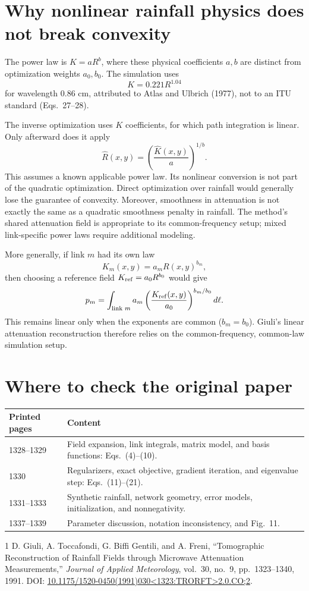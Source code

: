 \documentclass[11pt,a4paper]{article}
\begin{document}
\section{Why nonlinear rainfall physics does not break convexity}
The power law is $K=aR^b$, where these physical coefficients $a,b$ are distinct from optimization weights $a_0,b_0$. The simulation uses
\[
K=0.221R^{1.04}
\]
for wavelength $0.86$ cm, attributed to Atlas and Ulbrich (1977), not to an ITU standard (Eqs.~27--28).

The inverse optimization uses $K$ coefficients, for which path integration is linear. Only afterward does it apply
\[
\widehat R(x,y)=\left(\frac{\widehat K(x,y)}a\right)^{1/b}.
\]
This assumes a known applicable power law. Its nonlinear conversion is not part of the quadratic optimization. Direct optimization over rainfall would generally lose the guarantee of convexity. Moreover, smoothness in attenuation is not exactly the same as a quadratic smoothness penalty in rainfall. The method's shared attenuation field is appropriate to its common-frequency setup; mixed link-specific power laws require additional modeling.

More generally, if link $m$ had its own law
\[
K_m(x,y)=a_mR(x,y)^{b_m},
\]
then choosing a reference field
$K_{\rm ref}=a_0R^{b_0}$ would give
\[
p_m=\int_{\text{link }m}a_m
\left(\frac{K_{\rm ref}(x,y)}{a_0}\right)^{b_m/b_0}d\ell.
\]
This remains linear only when the exponents are common ($b_m=b_0$). Giuli's
linear attenuation reconstruction therefore relies on the common-frequency,
common-law simulation setup.
\section{Where to check the original paper}
\begin{center}
\begin{tabular}{p{25mm}p{100mm}}
\toprule
Printed pages & Content \\
\midrule
1328--1329 & Field expansion, link integrals, matrix model, and basis functions: Eqs.~(4)--(10).\\
1330 & Regularizers, exact objective, gradient iteration, and eigenvalue step: Eqs.~(11)--(21).\\
1331--1333 & Synthetic rainfall, network geometry, error models, initialization, and nonnegativity.\\
1337--1339 & Parameter discussion, notation inconsistency, and Fig.~11.\\
\bottomrule
\end{tabular}
\end{center}
\begin{thebibliography}{1}
D. Giuli, A. Toccafondi, G. Biffi Gentili, and A. Freni,
``Tomographic Reconstruction of Rainfall Fields through Microwave Attenuation Measurements,''
\emph{Journal of Applied Meteorology}, vol.~30, no.~9, pp.~1323--1340, 1991.
DOI: \href{https://doi.org/10.1175/1520-0450(1991)030<1323:TRORFT>2.0.CO;2}{10.1175/1520-0450(1991)030\textless1323:TRORFT\textgreater2.0.CO;2}.
\end{thebibliography}
\end{document}
